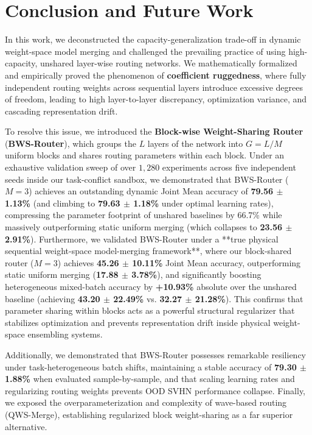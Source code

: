 \section{Conclusion and Future Work}
\label{sec:conclusion}

In this work, we deconstructed the capacity-generalization trade-off in dynamic weight-space model merging and challenged the prevailing practice of using high-capacity, unshared layer-wise routing networks. We mathematically formalized and empirically proved the phenomenon of \textbf{coefficient ruggedness}, where fully independent routing weights across sequential layers introduce excessive degrees of freedom, leading to high layer-to-layer discrepancy, optimization variance, and cascading representation drift. 

To resolve this issue, we introduced the \textbf{Block-wise Weight-Sharing Router} (\textbf{BWS-Router}), which groups the $L$ layers of the network into $G = L / M$ uniform blocks and shares routing parameters within each block. Under an exhaustive validation sweep of over $1,280$ experiments across five independent seeds inside our task-conflict sandbox, we demonstrated that BWS-Router ($M=3$) achieves an outstanding dynamic Joint Mean accuracy of \textbf{79.56 $\pm$ 1.13\%} (and climbing to \textbf{79.63 $\pm$ 1.18\%} under optimal learning rates), compressing the parameter footprint of unshared baselines by 66.7\% while massively outperforming static uniform merging (which collapses to \textbf{23.56 $\pm$ 2.91\%}). Furthermore, we validated BWS-Router under a **true physical sequential weight-space model-merging framework**, where our block-shared router ($M=3$) achieves \textbf{45.26 $\pm$ 10.11\%} Joint Mean accuracy, outperforming static uniform merging (\textbf{17.88 $\pm$ 3.78\%}), and significantly boosting heterogeneous mixed-batch accuracy by \textbf{+10.93\%} absolute over the unshared baseline (achieving \textbf{43.20 $\pm$ 22.49\%} vs. \textbf{32.27 $\pm$ 21.28\%}). This confirms that parameter sharing within blocks acts as a powerful structural regularizer that stabilizes optimization and prevents representation drift inside physical weight-space ensembling systems. 

Additionally, we demonstrated that BWS-Router possesses remarkable resiliency under task-heterogeneous batch shifts, maintaining a stable accuracy of \textbf{79.30 $\pm$ 1.88\%} when evaluated sample-by-sample, and that scaling learning rates and regularizing routing weights prevents OOD SVHN performance collapse. Finally, we exposed the overparameterization and complexity of wave-based routing (QWS-Merge), establishing regularized block weight-sharing as a far superior alternative.

